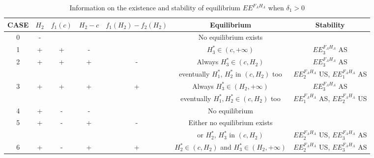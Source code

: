 \documentclass{article}
\begin{document}
\begin{appendices}
\begin{table}[!ht]
\centering
\caption{Information on the existence and stability of equilibrium $EE^{F_AH_A}$ when $\delta_1 > 0$}
\label{modelFAHA:stability endemic, delta1>0}
{\small
\begin{tabular}{c|c|c|c|c|c|c}
CASE & $H_2$ & $f_1(c)$ & $H_2 - c$ & $f_1(H_2) - f_2(H_2)$ & Equilibrium & Stability\\
\hline
0 & - &   &   & & No equilibrium exists & \\
\hline
1 & + & + & - & & $H_3^* \in (c, +\infty)$ &$EE^{F_AH_A}_3$ AS\\
\hline
\multirow{2}{*}{2} & \multirow{2}{*}{+} & \multirow{2}{*}{+} & \multirow{2}{*}{+} & \multirow{2}{*}{-} & Always $H_3^* \in (c, H_2)$ & $EE^{F_AH_A}_3$ AS \\
& & & & & eventually $H_1^*$, $H_2^*$ in $(c, H_2)$ too  & $EE^{F_AH_A}_2$ US, $EE^{F_AH_A}_1$ AS\\
\hline
\multirow{2}{*}{3} & \multirow{2}{*}{+} & \multirow{2}{*}{+} & \multirow{2}{*}{+} & \multirow{2}{*}{+} & Always $ H_3^* \in (H_2, +\infty)$ &$EE^{F_AH_A}_3$ AS \\
& & & & &  eventually $H_1^*, H^*_2 \in (c, H_2)$ too &$EE^{F_AH_A}_1$ AS, $EE^{F_AH_A}_2$ US \\
\hline
4 & + & - & - & & No equilibrium & \\
\hline
\multirow{2}{*}{5} & \multirow{2}{*}{+} & \multirow{2}{*}{-} & \multirow{2}{*}{+} & \multirow{2}{*}{-} & Either no equilibrium exists \\
& & & & & or $H_2^*$, $H_3^*$ in $(c, H_2)$ & $EE^{F_AH_A}_2$ US, $EE^{F_AH_A}_3$ AS \\
\hline
6 & + &- & + & + & $H_2^* \in (c, H_2)$ and $H_3^* \in (H_2, + \infty)$ & $EE^{F_AH_A}_2$ US, $EE^{F_AH_A}_3$ AS
\end{tabular}}
\end{table} 


\end{appendices}
\end{document}
